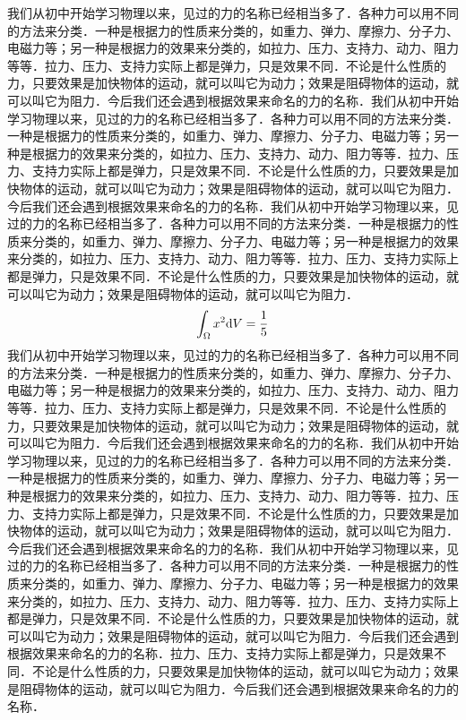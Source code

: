 \documentclass[themecolor=vineyard,fontscale=small]{textbook-cn}%
\begin{document}
\begin{Article}
我们从初中开始学习物理以来，见过的力的名称已经相当多了．各种力可以用不同的方法来分类．一种是根据力的性质来分类的，如重力、弹力、摩擦力、分子力、电磁力等；另一种是根据力的效果来分类的，如拉力、压力、支持力、动力、阻力等等．拉力、压力、支持力实际上都是弹力，只是效果不同．不论是什么性质的力，只要效果是加快物体的运动，就可以叫它为动力；效果是阻碍物体的运动，就可以叫它为阻力．今后我们还会遇到根据效果来命名的力的名称．我们从初中开始学习物理以来，见过的力的名称已经相当多了．各种力可以用不同的方法来分类．一种是根据力的性质来分类的，如重力、弹力、摩擦力、分子力、电磁力等；另一种是根据力的效果来分类的，如拉力、压力、支持力、动力、阻力等等．拉力、压力、支持力实际上都是弹力，只是效果不同．不论是什么性质的力，只要效果是加快物体的运动，就可以叫它为动力；效果是阻碍物体的运动，就可以叫它为阻力．今后我们还会遇到根据效果来命名的力的名称．我们从初中开始学习物理以来，见过的力的名称已经相当多了．各种力可以用不同的方法来分类．一种是根据力的性质来分类的，如重力、弹力、摩擦力、分子力、电磁力等；另一种是根据力的效果来分类的，如拉力、压力、支持力、动力、阻力等等．拉力、压力、支持力实际上都是弹力，只是效果不同．不论是什么性质的力，只要效果是加快物体的运动，就可以叫它为动力；效果是阻碍物体的运动，就可以叫它为阻力．
$$
\int_\Omega x^2{\rm d}V=\frac{1}{5}
$$
我们从初中开始学习物理以来，见过的力的名称已经相当多了．各种力可以用不同的方法来分类．一种是根据力的性质来分类的，如重力、弹力、摩擦力、分子力、电磁力等；另一种是根据力的效果来分类的，如拉力、压力、支持力、动力、阻力等等．拉力、压力、支持力实际上都是弹力，只是效果不同．不论是什么性质的力，只要效果是加快物体的运动，就可以叫它为动力；效果是阻碍物体的运动，就可以叫它为阻力．今后我们还会遇到根据效果来命名的力的名称．我们从初中开始学习物理以来，见过的力的名称已经相当多了．各种力可以用不同的方法来分类．一种是根据力的性质来分类的，如重力、弹力、摩擦力、分子力、电磁力等；另一种是根据力的效果来分类的，如拉力、压力、支持力、动力、阻力等等．拉力、压力、支持力实际上都是弹力，只是效果不同．不论是什么性质的力，只要效果是加快物体的运动，就可以叫它为动力；效果是阻碍物体的运动，就可以叫它为阻力．今后我们还会遇到根据效果来命名的力的名称．我们从初中开始学习物理以来，见过的力的名称已经相当多了．各种力可以用不同的方法来分类．一种是根据力的性质来分类的，如重力、弹力、摩擦力、分子力、电磁力等；另一种是根据力的效果来分类的，如拉力、压力、支持力、动力、阻力等等．拉力、压力、支持力实际上都是弹力，只是效果不同．不论是什么性质的力，只要效果是加快物体的运动，就可以叫它为动力；效果是阻碍物体的运动，就可以叫它为阻力．今后我们还会遇到根据效果来命名的力的名称．拉力、压力、支持力实际上都是弹力，只是效果不同．不论是什么性质的力，只要效果是加快物体的运动，就可以叫它为动力；效果是阻碍物体的运动，就可以叫它为阻力．今后我们还会遇到根据效果来命名的力的名称．


\end{Article}
\end{document}
